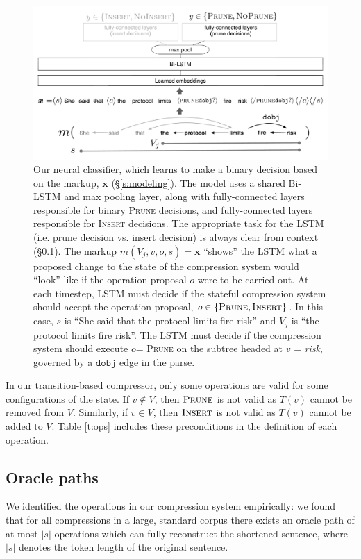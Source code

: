 \documentclass[11pt,a4paper]{article}
\begin{document}
\begin{figure}[htb!]
\centering
\includegraphics[width=.85\textwidth]{example.pdf}
\caption{Our neural classifier, which learns to make a binary decision based on the markup, $\bm{x}$ (\S\ref{s:modeling}). The model uses a shared Bi-LSTM and max pooling layer, along with fully-connected layers responsible for binary \textsc{Prune} decisions, and fully-connected layers responsible for \textsc{Insert} decisions. The appropriate task for the LSTM (i.e. prune decision vs. insert decision) is always clear from context (\S\ref{s:oracle}). The markup $m(V_j,v,o,s)=\bm{x}$ ``shows'' the LSTM what a proposed change to the state of the compression system would ``look'' like if the operation proposal $o$ were to be carried out. At each timestep, LSTM must decide if the stateful compression system should accept the operation proposal, $o \in \{\textsc{Prune}, \textsc{Insert}\}$. In this case, $s$ is ``She said that the protocol limits fire risk'' and $V_j$ is ``the protocol limits fire risk''.  The LSTM must decide if the compression system should execute $o$= \textsc{Prune} on the subtree headed at $v$ = \textit{risk}, governed by a $\texttt{dobj}$ edge in the parse. }
\label{f:example}
\end{figure}

In our transition-based compressor, only some operations are valid for some configurations of the state. If $v \notin V$, then $\textsc{Prune}$ is not valid as $T(v)$ cannot be removed from $V$. Similarly, if $v \in V$, then $\textsc{Insert}$ is not valid as $T(v)$ cannot be added to $V$. Table \ref{t:ops} includes these preconditions in the definition of each operation.

\subsection{Oracle paths}\label{s:oracle}

We identified the operations in our compression system empirically: we found that for all compressions in a large, standard corpus \cite{filippova2013overcoming} there exists an oracle path of at most $|s|$ operations which can fully reconstruct the shortened sentence, where $|s|$ denotes the token length of the original sentence.
\end{document}
